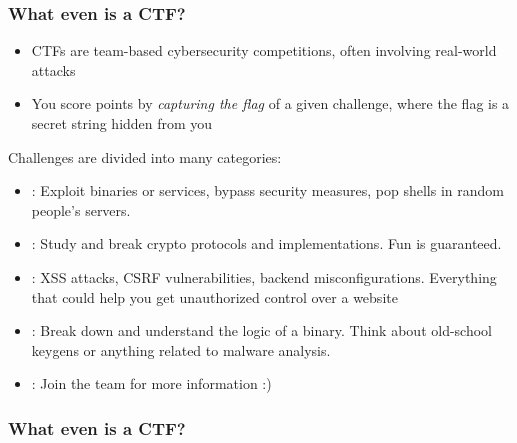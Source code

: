 \documentclass[aspectratio=169]{beamer}
\begin{document}
\begin{frame}
	\frametitle{What even is a CTF?}
	\begin{itemize}
		\item CTFs are team-based cybersecurity competitions, often involving real-world attacks
        \item You score points by \emph{capturing the flag} of a given challenge, where the flag is a secret string hidden from you
	\end{itemize}
	\pause
	Challenges are divided into many categories:
	\begin{itemize}
		\item {}: Exploit binaries or services, bypass security measures, pop shells in random people's servers.
        \pause

		\item {}: Study and break crypto protocols and implementations.
        Fun is guaranteed.
        \pause

		\item {}: XSS attacks, CSRF vulnerabilities, backend misconfigurations. Everything that could help you get unauthorized control over a website
        \pause

		\item {}: Break down and understand the logic of a binary. Think about old-school keygens or anything related to malware analysis.
        \pause

		\item {}: Join the team for more information :)
	\end{itemize}
\end{frame}

\begin{frame}
	\frametitle{What even is a CTF?}
	\begin{center}
	\end{center}
\end{frame}
\end{document}
